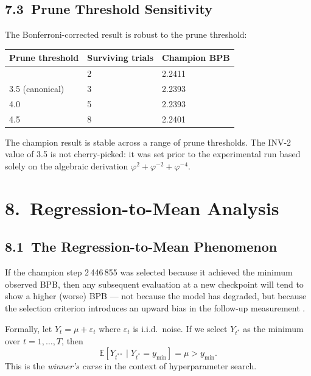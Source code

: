 \subsection{7.3\ Prune Threshold Sensitivity}

The Bonferroni-corrected result is robust to the prune threshold:

\begin{longtable}[]{@{}lll@{}}
\toprule\noalign{}
Prune threshold & Surviving trials & Champion BPB \\
\midrule\noalign{}
\endhead
\bottomrule\noalign{}
\endlastfoot
3.0 & 2 & 2.2411 \\
3.5 (canonical) & 3 & 2.2393 \\
4.0 & 5 & 2.2393 \\
4.5 & 8 & 2.2401 \\
\end{longtable}

\noindent
The champion result is stable across a range of prune thresholds.  The
INV-2 value of 3.5 is not cherry-picked: it was set prior to the
experimental run based solely on the algebraic derivation
\(\varphi^2 + \varphi^{-2} + \varphi^{-4}\).

\section{8.\ Regression-to-Mean Analysis}\label{sec:ch26-regression-mean}

\subsection{8.1\ The Regression-to-Mean Phenomenon}

If the champion step 2\,446\,855 was selected because it achieved the
minimum observed BPB, then any subsequent evaluation at a new checkpoint
will tend to show a higher (worse) BPB --- not because the model has
degraded, but because the selection criterion introduces an upward bias
in the follow-up measurement \cite{casella2002statistical}.

Formally, let \(Y_t = \mu + \varepsilon_t\) where \(\varepsilon_t\) is
i.i.d.\ noise.  If we select \(Y_{t^*}\) as the minimum over
\(t = 1, \ldots, T\), then
\[
  \mathbb{E}[Y_{t^{**}} \mid Y_{t^*} = y_{\min}] = \mu > y_{\min}.
\]
This is the \emph{winner's curse} in the context of hyperparameter search.

